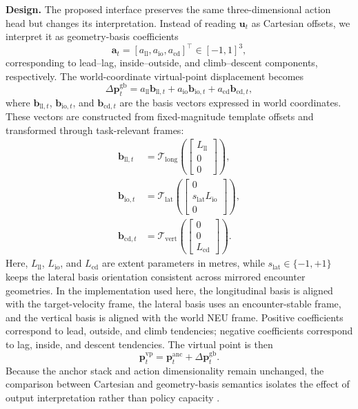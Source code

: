 \documentclass[drones,article,submit,pdftex,moreauthors]{Definitions/mdpi}
\begin{document}
\textbf{Design.} The proposed interface preserves the same three-dimensional action head but changes its interpretation. Instead of reading $\mathbf{u}_t$ as Cartesian offsets, we interpret it as geometry-basis coefficients
\begin{equation}
\mathbf{a}_t = [a_{\mathrm{ll}}, a_{\mathrm{io}}, a_{\mathrm{cd}}]^\top \in [-1,1]^3,
\end{equation}
corresponding to lead--lag, inside--outside, and climb--descent components, respectively. The world-coordinate virtual-point displacement becomes
\begin{equation}
\Delta \mathbf{p}^{\mathrm{gb}}_t
=
a_{\mathrm{ll}} \mathbf{b}_{\mathrm{ll},t}
+ a_{\mathrm{io}} \mathbf{b}_{\mathrm{io},t}
+ a_{\mathrm{cd}} \mathbf{b}_{\mathrm{cd},t},
\label{eq:geometry_basis_offset}
\end{equation}
where $\mathbf{b}_{\mathrm{ll},t}$, $\mathbf{b}_{\mathrm{io},t}$, and $\mathbf{b}_{\mathrm{cd},t}$ are the basis vectors expressed in world coordinates. These vectors are constructed from fixed-magnitude template offsets and transformed through task-relevant frames:
\begin{align}
\mathbf{b}_{\mathrm{ll},t} &= \mathcal{T}_{\mathrm{long}}
\left(
\begin{bmatrix}
L_{\mathrm{ll}} \\
0 \\
0
\end{bmatrix}
\right), \\
\mathbf{b}_{\mathrm{io},t} &= \mathcal{T}_{\mathrm{lat}}
\left(
\begin{bmatrix}
0 \\
s_{\mathrm{lat}} L_{\mathrm{io}} \\
0
\end{bmatrix}
\right), \\
\mathbf{b}_{\mathrm{cd},t} &= \mathcal{T}_{\mathrm{vert}}
\left(
\begin{bmatrix}
0 \\
0 \\
L_{\mathrm{cd}}
\end{bmatrix}
\right).
\end{align}
Here, $L_{\mathrm{ll}}$, $L_{\mathrm{io}}$, and $L_{\mathrm{cd}}$ are extent parameters in metres, while $s_{\mathrm{lat}} \in \{-1, +1\}$ keeps the lateral basis orientation consistent across mirrored encounter geometries. In the implementation used here, the longitudinal basis is aligned with the target-velocity frame, the lateral basis uses an encounter-stable frame, and the vertical basis is aligned with the world NEU frame. Positive coefficients correspond to lead, outside, and climb tendencies; negative coefficients correspond to lag, inside, and descent tendencies. The virtual point is then
\begin{equation}
\mathbf{p}^{\mathrm{vp}}_t = \mathbf{p}^{\mathrm{anc}}_t + \Delta \mathbf{p}^{\mathrm{gb}}_t.
\end{equation}
Because the anchor stack and action dimensionality remain unchanged, the comparison between Cartesian and geometry-basis semantics isolates the effect of output interpretation rather than policy capacity \cite{xu2022ast}.
\end{document}
